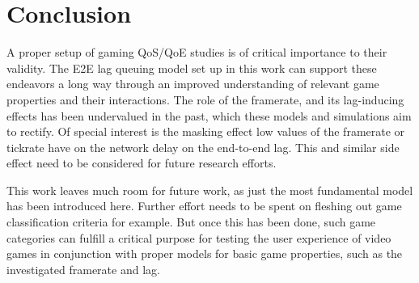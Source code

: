 \section{Conclusion}
\label{sec:conclusion}

A proper setup of gaming \gls{QoS}/\gls{QoE} studies is of critical importance to their validity. The \gls{E2E} lag queuing model set up in this work can support these endeavors a long way through an improved understanding of relevant game properties and their interactions. The role of the framerate, and its lag-inducing effects has been undervalued in the past, which these models and simulations aim to rectify. Of special interest is the masking effect low values of the framerate or tickrate have on the network delay on the end-to-end lag. This and similar side effect need to be considered for future research efforts.


This work leaves much room for future work, as just the most fundamental model has been introduced here. Further effort needs to be spent on fleshing out game classification criteria for example. But once this has been done, such game categories can fulfill a critical purpose for testing the user experience of video games in conjunction with proper models for basic game properties, such as the investigated framerate and lag.
